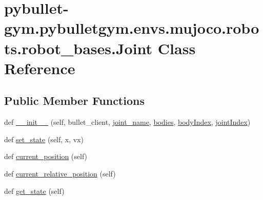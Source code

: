 \hypertarget{classpybullet-gym_1_1pybulletgym_1_1envs_1_1mujoco_1_1robots_1_1robot__bases_1_1_joint}{}\section{pybullet-\/gym.pybulletgym.\+envs.\+mujoco.\+robots.\+robot\+\_\+bases.\+Joint Class Reference}
\label{classpybullet-gym_1_1pybulletgym_1_1envs_1_1mujoco_1_1robots_1_1robot__bases_1_1_joint}
\subsection*{Public Member Functions}
\begin{DoxyCompactItemize}
\item 
def \hyperlink{classpybullet-gym_1_1pybulletgym_1_1envs_1_1mujoco_1_1robots_1_1robot__bases_1_1_joint_ab35601b2f4732485a1a57e1dc944a24d}{\+\_\+\+\_\+init\+\_\+\+\_\+} (self, bullet\+\_\+client, \hyperlink{classpybullet-gym_1_1pybulletgym_1_1envs_1_1mujoco_1_1robots_1_1robot__bases_1_1_joint_afb96c7dfff6af8c0d060fba1090304bb}{joint\+\_\+name}, \hyperlink{classpybullet-gym_1_1pybulletgym_1_1envs_1_1mujoco_1_1robots_1_1robot__bases_1_1_joint_aa57be4597c5f06fd202650b626f6833d}{bodies}, \hyperlink{classpybullet-gym_1_1pybulletgym_1_1envs_1_1mujoco_1_1robots_1_1robot__bases_1_1_joint_afef5c0540141f799973341b141c7e31d}{body\+Index}, \hyperlink{classpybullet-gym_1_1pybulletgym_1_1envs_1_1mujoco_1_1robots_1_1robot__bases_1_1_joint_ae67e7e53cc9cd04c180c45b5fce2f6d1}{joint\+Index})
\item 
def \hyperlink{classpybullet-gym_1_1pybulletgym_1_1envs_1_1mujoco_1_1robots_1_1robot__bases_1_1_joint_a514b524341b38cbee40e94bf9fd55fb5}{set\+\_\+state} (self, x, vx)
\item 
def \hyperlink{classpybullet-gym_1_1pybulletgym_1_1envs_1_1mujoco_1_1robots_1_1robot__bases_1_1_joint_a3717cdc3723ad516594c5fdf8f074be1}{current\+\_\+position} (self)
\item 
def \hyperlink{classpybullet-gym_1_1pybulletgym_1_1envs_1_1mujoco_1_1robots_1_1robot__bases_1_1_joint_a07ed15644bdac8d44e4a1c997cf7d259}{current\+\_\+relative\+\_\+position} (self)
\item 
def \hyperlink{classpybullet-gym_1_1pybulletgym_1_1envs_1_1mujoco_1_1robots_1_1robot__bases_1_1_joint_af9edc94f05d65bf24b7aa024b50cdae7}{get\+\_\+state} (self)
\item 

\end{DoxyCompactItemize}
